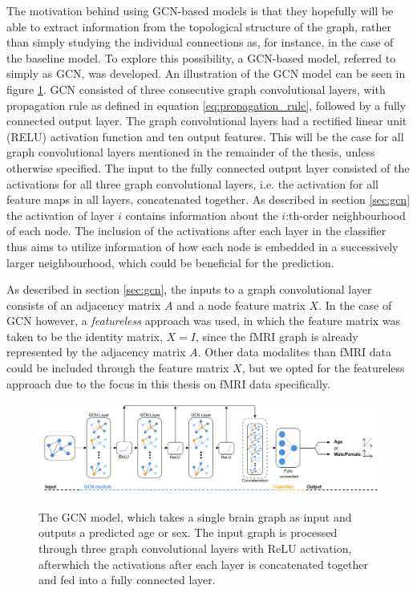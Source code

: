 The motivation behind using GCN-based models is that they hopefully will be able to extract information from the topological structure of the graph, rather than simply studying the individual connections as, for instance, in the case of the baseline model. To explore this possibility, a GCN-based model, referred to simply as GCN, was developed. An illustration of the GCN model can be seen in figure \ref{fig:gcn_base}. GCN consisted of three consecutive graph convolutional layers, with propagation rule as defined in equation \eqref{eq:propagation_rule}, followed by a fully connected output layer. The graph convolutional layers had a rectified linear unit (RELU) activation function and ten output features. This will be the case for all graph convolutional layers mentioned in the remainder of the thesis, unless otherwise specified. The input to the fully connected output layer consisted of the activations for all three graph convolutional layers, i.e. the activation for all feature maps in all layers, concatenated together. As described in section \ref{sec:gcn} the activation of layer $i$ contains information about the $i$:th-order neighbourhood of each node. The inclusion of the activations after each layer in the classifier thus aims to utilize information of how each node is embedded in a successively larger neighbourhood, which could be beneficial for the prediction.

As described in section \ref{sec:gcn}, the inputs to a graph convolutional layer consists of an adjacency matrix $A$ and a node feature matrix $X$. In the case of GCN however, a \textit{featureless} approach was used, in which the feature matrix was taken to be the identity matrix, $X=I$, since the fMRI graph is already represented by the adjacency matrix $A$. Other data modalites than fMRI data could be included through the feature matrix $X$, but we opted for the featureless approach due to the focus in this thesis on fMRI data specifically.

%         

\begin{figure}[H]
    \centering
    \includegraphics[width=\textwidth]{chapters/images_methods/base_v2.png}
    \caption{The GCN model, which takes a single brain graph as input and outputs a predicted age or sex. The input graph is processed through three graph convolutional layers with ReLU activation, afterwhich the activations after each layer is concatenated together and fed into a fully connected layer.}
    \label{fig:gcn_base}
\end{figure}


